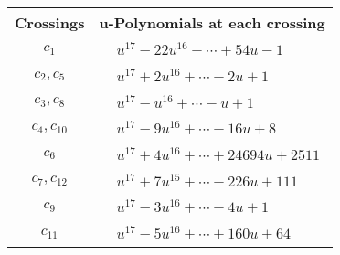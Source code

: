 \documentclass[1p]{elsarticle_modified}
\theoremstyle{definition}
\begin{document}
\begin{tabular}{m{50pt}|m{274pt}}
Crossings & \hspace{64pt}u-Polynomials at each crossing \\
\hline $$\begin{aligned}c_{1}\end{aligned}$$&$\begin{aligned}
&u^{17}-22 u^{16}+\cdots+54 u-1
\end{aligned}$\\
\hline $$\begin{aligned}c_{2},c_{5}\end{aligned}$$&$\begin{aligned}
&u^{17}+2 u^{16}+\cdots-2 u+1
\end{aligned}$\\
\hline $$\begin{aligned}c_{3},c_{8}\end{aligned}$$&$\begin{aligned}
&u^{17}- u^{16}+\cdots- u+1
\end{aligned}$\\
\hline $$\begin{aligned}c_{4},c_{10}\end{aligned}$$&$\begin{aligned}
&u^{17}-9 u^{16}+\cdots-16 u+8
\end{aligned}$\\
\hline $$\begin{aligned}c_{6}\end{aligned}$$&$\begin{aligned}
&u^{17}+4 u^{16}+\cdots+24694 u+2511
\end{aligned}$\\
\hline $$\begin{aligned}c_{7},c_{12}\end{aligned}$$&$\begin{aligned}
&u^{17}+7 u^{15}+\cdots-226 u+111
\end{aligned}$\\
\hline $$\begin{aligned}c_{9}\end{aligned}$$&$\begin{aligned}
&u^{17}-3 u^{16}+\cdots-4 u+1
\end{aligned}$\\
\hline $$\begin{aligned}c_{11}\end{aligned}$$&$\begin{aligned}
&u^{17}-5 u^{16}+\cdots+160 u+64
\end{aligned}$\\
\hline
\end{tabular}\\~\\
\end{document}

